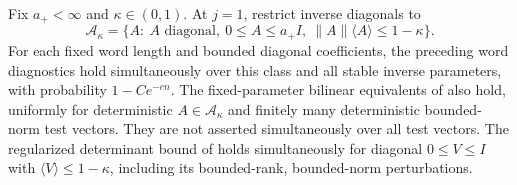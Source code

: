 \begin{lemma}
\label{cap:restricted-words}
Fix $a_+<\infty$ and $\kappa\in(0,1)$.  At $j=1$, restrict inverse
diagonals to
\begin{equation}\label{cap:restricted-diagonals}
 \mathcal A_\kappa=
 \{A:\ A\text{ diagonal},\ 0\le A\le a_+I,
                     \ \|A\|\langle A\rangle\le1-\kappa\}.
\end{equation}
For each fixed word length and bounded diagonal coefficients, the preceding
word diagnostics hold simultaneously over this class and all stable
inverse parameters, with probability $1-Ce^{-cn}$.  The fixed-parameter
bilinear equivalents of \cite[Lemma~3.4]{AcceptedGap} also hold, uniformly
for deterministic $A\in\mathcal A_\kappa$ and finitely many deterministic
bounded-norm test vectors.  They are not asserted simultaneously over all
test vectors.  The regularized determinant bound of
\cite[Lemma~3.5]{AcceptedGap} holds simultaneously for diagonal \(0\le V\le I\)
with $\langle V\rangle\le1-\kappa$, including its bounded-rank,
bounded-norm perturbations.
\end{lemma}


